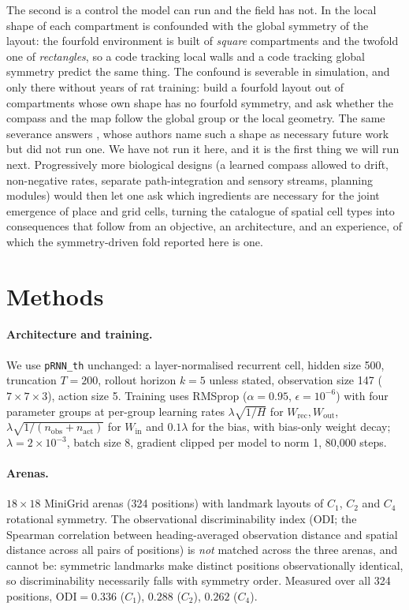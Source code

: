 \documentclass[9pt,lineno]{elife}
\begin{document}
The second is a control the model can run and the field has not. In \citet{zhang2022} the local shape of
each compartment is confounded with the global symmetry of the layout: the fourfold environment is built
of \emph{square} compartments and the twofold one of \emph{rectangles}, so a code tracking local walls
and a code tracking global symmetry predict the same thing. The confound is severable in simulation, and
only there without years of rat training: build a fourfold layout out of compartments whose own shape has
no fourfold symmetry, and ask whether the compass and the map follow the global group or the local
geometry. The same severance answers \citet{lachance2024}, whose authors name such a shape as necessary
future work but did not run one. We have not run it here, and it is the first thing we will run next.
Progressively more biological designs (a learned compass allowed to drift, non-negative rates, separate
path-integration and sensory streams, planning modules) would then let one ask which ingredients are
necessary for the joint emergence of place and grid cells, turning the catalogue of spatial cell types
into consequences that follow from an objective, an architecture, and an experience, of which the
symmetry-driven fold reported here is one.

\section{Methods}

\paragraph{Architecture and training.} We use \texttt{pRNN\_th} \citep{levenstein2024} unchanged:
a layer-normalised recurrent cell, hidden size 500, truncation $T = 200$, rollout horizon $k=5$
unless stated, observation size 147 ($7\times7\times3$), action size 5. Training uses RMSprop
($\alpha = 0.95$, $\epsilon = 10^{-6}$) with four parameter groups at per-group learning rates
$\lambda\sqrt{1/H}$ for $W_{\text{rec}}, W_{\text{out}}$, $\lambda\sqrt{1/(n_{\text{obs}} +
n_{\text{act}})}$ for $W_{\text{in}}$ and $0.1\lambda$ for the bias, with bias-only weight decay;
$\lambda = 2\times10^{-3}$, batch size 8, gradient clipped per model to norm 1, 80{,}000 steps.

\paragraph{Arenas.} $18\times18$ MiniGrid arenas (324 positions) with landmark layouts of $C_1$,
$C_2$ and $C_4$ rotational symmetry. The observational discriminability index (ODI; the Spearman
correlation between heading-averaged observation distance and spatial distance across all pairs
of positions) is \emph{not} matched across the three arenas, and cannot be: symmetric landmarks
make distinct positions observationally identical, so discriminability necessarily falls with
symmetry order. Measured over all 324 positions, $\mathrm{ODI} = 0.336$ ($C_1$), $0.288$ ($C_2$),
$0.262$ ($C_4$).
\end{document}
